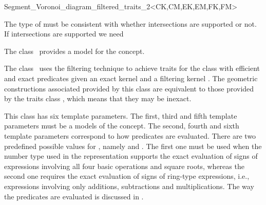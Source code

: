 

\begin{ccRefClass}
{Segment_Voronoi_diagram_filtered_traits_2<CK,CM,EK,EM,FK,FM>}


{\sc The type of  must be consistent with whether
  intersections are supported or not. If intersections are supported
  we need }

\ccDefinition
  
The class \ccRefName\ provides a model for the
 concept.

The class \ccRefName\ uses the filtering technique \cite{bbp-iayed-01}
to achieve traits for the 
class with efficient and exact predicates given an exact
kernel  and a filtering kernel . The geometric
constructions associated provided by this class are equivalent
to those provided by the traits class
, which means that they
may be inexact.

This class has six template parameters. The first, third and fifth
template parameters must be a models of the  concept. The
second, fourth and sixth template parameters correspond to how
predicates are evaluated. There are two predefined possible values for
, namely  and
. The first one must be used when the number type
used in the representation supports the exact evaluation of signs of
expressions involving all four basic operations and square roots,
whereas the second one requires the exact evaluation of signs of
ring-type expressions, i.e., expressions involving only additions,
subtractions and multiplications.
%
The way the predicates are evaluated is discussed in
\cite{b-ecvdl-96,k-peasv-04}.


\end{ccRefClass}
